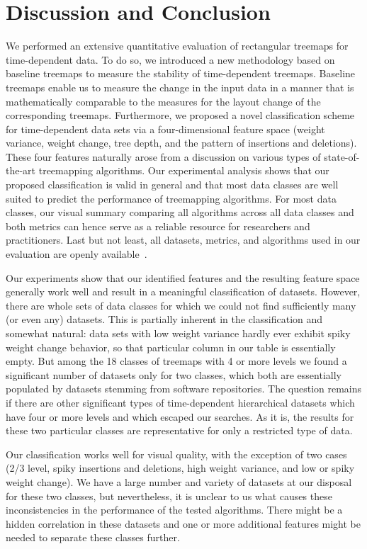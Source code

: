 \section{Discussion and Conclusion}
\label{sec:discussion-2}

We performed an extensive quantitative evaluation of rectangular treemaps for time-dependent data. To do so, we introduced a new methodology based on baseline treemaps to measure the stability of time-dependent treemaps. Baseline treemaps enable us to measure the change in the input data in a manner that is mathematically comparable to the measures for the layout change of the corresponding treemaps. Furthermore, we proposed a novel classification scheme for time-dependent data sets via a four-dimensional feature space (weight variance, weight change, tree depth, and the pattern of insertions and deletions). These four features naturally arose from a discussion on various types of state-of-the-art treemapping algorithms. Our experimental analysis shows that our proposed classification is valid in general and that most data classes are well suited to predict the performance of treemapping algorithms. For most data classes, our visual summary comparing all algorithms across all data classes and both metrics can hence serve as a reliable resource for researchers and practitioners. Last but not least, all datasets, metrics, and algorithms used in our evaluation are openly available~\citep{URLTreemaps}.

 Our experiments show that our identified features and the resulting feature space generally work well and result in a meaningful classification of datasets. However, there are whole sets of data classes for which we could not find sufficiently many (or even any) datasets. This is partially inherent in the classification and somewhat natural: data sets with low weight variance hardly ever exhibit spiky weight change behavior, so that particular column in our table is essentially empty. But among the 18 classes of treemaps with 4 or more levels we found a significant number of datasets only for two classes, which both are essentially populated by datasets stemming from software repositories. The question remains if there are other significant types of time-dependent hierarchical datasets which have four or more levels and which escaped our searches. As it is, the results for these two particular classes are representative for only a restricted type of data.

Our classification works well for visual quality, with the exception of two cases (2/3 level, spiky insertions and deletions, high weight variance, and low or spiky weight change). We have a large number and variety of datasets at our disposal for these two classes, but nevertheless, it is unclear to us what causes these inconsistencies in the performance of the tested algorithms. There might be a hidden correlation in these datasets and one or more additional features might be needed to separate these classes further.

